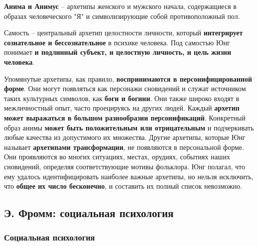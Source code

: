 \documentclass{article}
\begin{document}
\begin{flushleft}
\textbf{Анима и Анимус} – архетипы женского и мужского начала, содержащиеся в образах человеческого "Я" и символизирующие собой противоположный пол.

Самость – центральный архетип целостности личности, который \textbf{интегрирует сознательное и бессознательное} в психике человека. Под самостью Юнг понимает \textbf{и подлинный субъект, и целостную личность, и цель жизни человека}.

\hfill

Упомянутые архетипы, как правило, \textbf{воспринимаются в персонифицированной форме}. Они могут появляться как персонажи сновидений и служат источником таких культурных символов, как \textbf{боги и богини}. Они также широко входят в межличностный опыт, часто проецируясь на других людей. Каждый \textbf{архетип может выражаться в большом разнообразии персонификаций}. Конкретный образ анимы \textbf{может быть положительным или отрицательным} и подчеркивать любые качества из допустимого их множества. Другие архетипы, которые Юнг называет \textbf{архетипами трансформации}, не появляются в персональной форме. Они проявляются во многих ситуациях, местах, орудиях, событиях наших сновидений, определяя соответствующие мотивы фольклора. Юнг полагал, что ему удалось идентифицировать наиболее важные архетипы, но нельзя исключить, что \textbf{общее их число бесконечно}, и составить их полный список невозможно.
    
\end{flushleft}

\subsection{Э. Фромм: социальная психология}

\subsubsection{Социальная психология}
\end{document}
